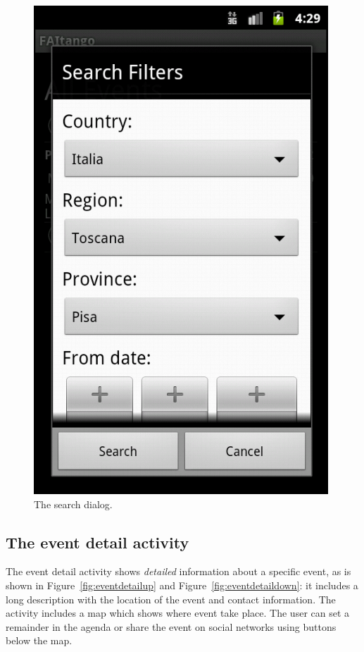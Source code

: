 \documentclass[12pt, twoside]{article}
\begin{document}
\begin{figure}[h]
\begin{center}
\includegraphics[scale=0.50]{fig/search-dialog.png}
\end{center}
\caption{The search dialog.}
\label{fig:searchdialog}
\end{figure}

\subsection{The event detail activity}

The event detail activity shows \emph{detailed} information about a specific event, as is shown in Figure~\ref{fig:eventdetailup} and Figure~\ref{fig:eventdetaildown}: it includes a long description with the location of the event and contact information. The activity includes a map which shows where event take place. The user can set a remainder in the agenda or share the event on social networks using buttons below the map.
\end{document}
